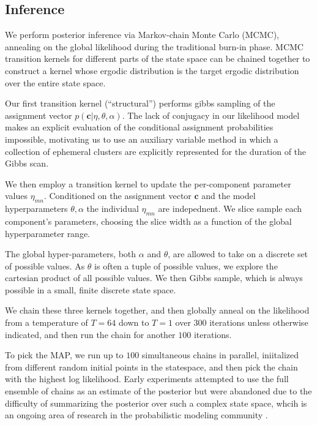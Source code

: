 \documentclass{article}
\renewcommand{\vec}[1]{\mathbf{#1}}
\begin{document}
\subsection{Inference} 
We perform posterior inference via Markov-chain Monte Carlo (MCMC),
annealing on the global likelihood during the traditional burn-in
phase. MCMC transition kernels for different parts of the state space
can be chained together to construct a kernel whose ergodic
distribution is the target ergodic distribution over the entire state space. 

Our first transition kernel (``structural'') performs gibbs sampling 
of the assignment vector $p(\vec{c} | \eta, \theta, \alpha)$. 
The lack of conjugacy in our likelihood model makes an explicit 
evaluation of the conditional assignment probabilities impossible, 
motivating us to use an auxiliary variable method \autocite{Neal2000}
in which a collection of ephemeral clusters are explicitly represented
for the duration of the Gibbs scan. 

We then employ a transition kernel to update the per-component
parameter values $\eta_{mn}$. Conditioned on the assignment vector
$\vec{c}$ and the model hyperparameters $\theta, \alpha$ the 
individual $\eta_{mn}$ are indepednent. We slice sample \autocite{Neal2003}
each component's parameters, choosing the slice width as a function
of the global hyperparameter range. 

The global hyper-parameters, both $\alpha$ and $\theta$, are allowed
to take on a discrete set of possible values. As $\theta$ is often a
tuple of possible values, we explore the cartesian product of all
possible values. We then Gibbs sample, which is always possible in a 
small, finite discrete state space. 

We chain these three kernels together, and then globally
anneal on the likelihood from a temperature of $T=64$ down to 
$T=1$ over 300 iterations unless otherwise indicated, and
then run the chain for another $100$ iterations. 

To pick the MAP, we run up to $100$ simultaneous chains in parallel,
iniitalized from different random initial points in the statespace,
and then pick the chain with the highest log likelihood. Early
experiments attempted to use the full ensemble of chains as an
estimate of the posterior but were abandoned due to the difficulty of
summarizing the posterior over such a complex state space, whcih is an
ongoing area of research in the probabilistic modeling community
\autocite{}.
\end{document}
